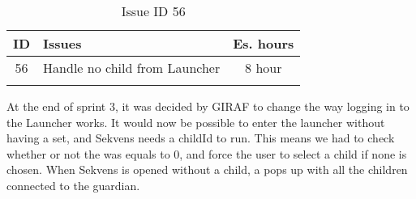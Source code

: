 \begin{longtable} { | c | p{12cm} | c | } 
\hline
	ID 	&	Issues	&		 Es. hours \\\hline
	56	&	Handle no child from Launcher	&	8 hour	\\\hline
\caption{Issue ID 56}
\label{tab:spr4_nochildfromlauncher}
\end{longtable}

At the end of sprint 3, it was decided by GIRAF to change the way logging in to the Launcher works. It would now be possible to enter the launcher without having a  set, and Sekvens needs a childId to run. This means we had to check whether or not the  was equals to 0, and force the user to select a child if none is chosen. When Sekvens is opened without a child, a  pops up with all the children connected to the guardian.